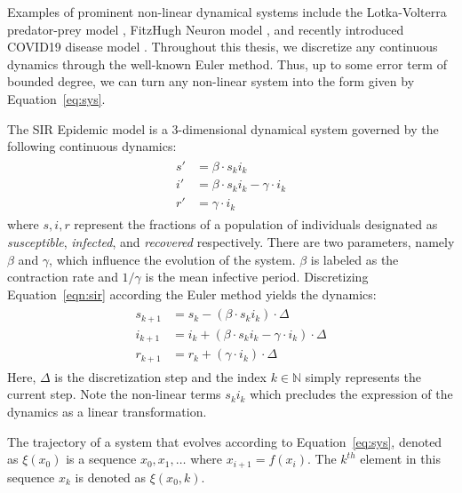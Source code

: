 Examples of prominent non-linear dynamical systems include the Lotka-Volterra predator-prey model \cite{wangersky1978lotka}, FitzHugh Neuron model \cite{fitzhugh1961impulses}, and recently introduced COVID19 disease model \cite{indiansuper2020supermodel}. Throughout this thesis, we discretize any continuous dynamics through the well-known Euler method. Thus, up to some error term of bounded degree, we can turn any non-linear system into the form given by Equation~\ref{eq:sys}.
%
\begin{example}
The SIR Epidemic model is a 3-dimensional dynamical system governed by the following continuous dynamics:
\begin{align} \label{eqn:sir}
    \begin{split}
        s' &= \beta \cdot s_k i_k \\
        i' &= \beta \cdot s_k i_k - \gamma \cdot i_k \\
        r' &= \gamma \cdot i_k
    \end{split}
\end{align}
where $s,i,r$ represent the fractions of a population of individuals designated as \textit{susceptible}, \textit{infected}, and \textit{recovered} respectively. There are two parameters, namely $\beta$ and $\gamma$, which influence the evolution of the system. $\beta$ is labeled as the contraction rate and $1/\gamma$ is the mean infective period.
%
Discretizing Equation~\ref{eqn:sir} according the Euler method yields the dynamics:
%
\begin{align} \label{eqn:discrete_sir}
    \begin{split}
        s_{k+1} &= s_k - (\beta \cdot s_k i_k)\cdot\Delta \\
        i_{k+1} &= i_k + (\beta \cdot s_k i_k - \gamma \cdot i_k)\cdot\Delta \\
        r_{k+1} &= r_k + (\gamma\cdot i_k)\cdot\Delta
    \end{split}
\end{align}
 Here, $\Delta$ is the discretization step and the index $k \in \mathbb{N}$ simply represents the current step.
%
Note the non-linear terms $s_ki_k$ which precludes the expression of the dynamics as a linear transformation.
\end{example}

The trajectory of a system that evolves according to Equation~\ref{eq:sys}, denoted as $\xi(x_0)$ is a sequence $x_0, x_1, \ldots $ where $x_{i+1} = f(x_i)$.
%
The $k^{th}$ element in this sequence $x_k$ is denoted as $\xi(x_0,k)$.

